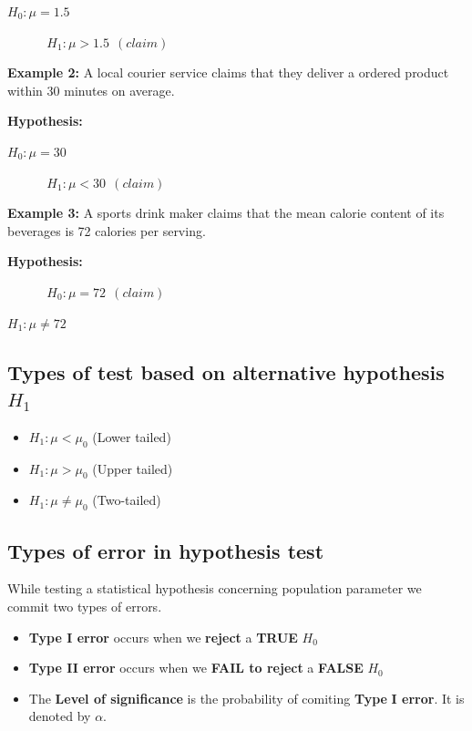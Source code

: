 \documentclass[
  11pt,
  letterpaper,
  DIV=11,
  numbers=noendperiod]{scrreprt}
\begin{document}
\(H_0:\mu=1.5\)

\(\ \ \ \ \ \ \ \ \ \ \ \ \ \  H_1: \mu>1.5 \ \ (claim)\)

\textbf{Example 2:} A local courier service claims that they deliver a
ordered product within 30 minutes on average.

\textbf{Hypothesis:}

\(H_0: \mu=30\)

\(\ \ \ \ \ \ \ \ \ \ \ \ \ \ H_1: \mu<30 \ \ (claim)\)

\textbf{Example 3:} A sports drink maker claims that the mean calorie
content of its beverages is 72 calories per serving.

\textbf{Hypothesis:}

\(\ \ \ \ \ \ \ \ \ \ \ \ \ \ H_0: \mu=72 \ \ (claim)\)

\(H_1: \mu \ne 72\)

\subsection{\texorpdfstring{Types of test based on alternative
hypothesis
\(H_1\)}{Types of test based on alternative hypothesis H\_1}}\label{types-of-test-based-on-alternative-hypothesis-h_1}

\begin{itemize}
\item
  \(H_1: \mu< \mu_0\) (Lower tailed)
\item
  \(H_1: \mu> \mu_0\) (Upper tailed)
\item
  \(H_1: \mu \ne \mu_0\) (Two-tailed)
\end{itemize}

\subsection{Types of error in hypothesis
test}\label{types-of-error-in-hypothesis-test}

While testing a statistical hypothesis concerning population parameter
we commit two types of errors.

\begin{itemize}
\item
  \textbf{Type I error} occurs when we \textbf{reject} a \textbf{TRUE}
  \(H_0\)
\item
  \textbf{Type II error} occurs when we \textbf{FAIL to reject} a
  \textbf{FALSE} \(H_0\)
\item
  The \textbf{Level of significance} is the probability of comiting
  \textbf{Type} \textbf{I error}. It is denoted by \(\alpha\).
\end{itemize}
\end{document}
